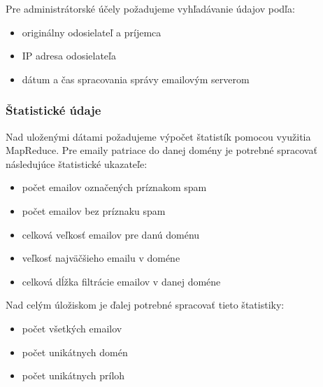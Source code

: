 \documentclass[11pt,twoside,a4paper]{book}
\begin{document}
\newpage
\noindent
Pre administrátorské účely požadujeme vyhľadávanie údajov podľa: %
\begin{itemize}
 \item originálny odosielateľ a príjemca
 \item IP adresa odosielateľa
 \item dátum a čas spracovania správy emailovým serverom
\end{itemize}


\subsubsection*{Štatistické údaje}
Nad uloženými dátami požadujeme výpočet štatistík pomocou využitia MapReduce. Pre emaily patriace do danej domény je potrebné spracovať následujúce štatistické ukazateľe:

\begin{itemize}
  \item
  počet emailov označených príznakom spam
  \item
  počet emailov bez príznaku spam
  \item
  celková veľkosť emailov pre danú doménu
  \item
  veľkosť najväčšieho emailu v doméne
  \item 
  celková dĺžka filtrácie emailov v danej doméne %
\end{itemize}
\noindent
Nad celým úložiskom je ďalej potrebné spracovať tieto štatistiky:
\begin{itemize}
  \item
  počet všetkých emailov
  \item 
  počet unikátnych domén
  \item
  počet unikátnych príloh
\end{itemize}


\end{document}
